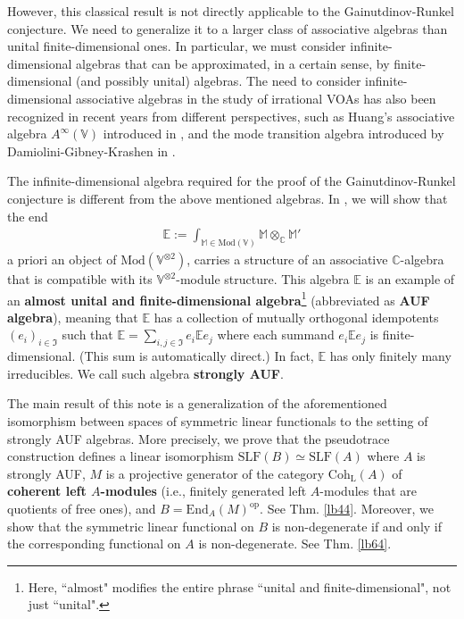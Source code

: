 \documentclass[11pt,b5paper,notitlepage]{article}
\theoremstyle{definition}
\theoremstyle{plain}
\newcommand{\fk}{\mathfrak}
\newcommand{\End}{\mathrm{End}} %
\newcommand{\opp}{\mathrm{op}}
\newcommand{\Vbb}{\mathbb V}
\newcommand{\Mbb}{\mathbb M}
\newcommand{\Cbb}{\mathbb C}
\newcommand{\Ebb}{\mathbb E}
\newcommand{\Mod}{\mathrm{Mod}}
\newcommand{\dps}{\displaystyle}
\newcommand{\Coh}{\mathrm{Coh}_{\mathrm L}}
\newcommand{\SLF}{\mathrm{SLF}}
\numberwithin{equation}{section}
\begin{document}
However, this classical result is not directly applicable to the Gainutdinov-Runkel conjecture. We need to generalize it to a larger class of associative algebras than unital finite-dimensional ones. In particular, we must consider infinite-dimensional algebras that can be approximated, in a certain sense, by finite-dimensional (and possibly unital) algebras. The need to consider infinite-dimensional associative algebras in the study of irrational VOAs has also been recognized in recent years from different perspectives, such as Huang's associative algebra $A^\infty(\Vbb)$ introduced in \cite{Hua-associative}, and the mode transition algebra introduced by Damiolini-Gibney-Krashen in \cite{DGK2}.


The infinite-dimensional algebra required for the proof of the Gainutdinov-Runkel conjecture is different from the above mentioned algebras. In \cite{GZ5}, we will show that the end
\begin{align*}
\dps\Ebb:=\int_{\Mbb\in\Mod(\Vbb)}\Mbb\otimes_\Cbb\Mbb'
\end{align*}
a priori an object of $\Mod(\Vbb^{\otimes2})$, carries a structure of an associative $\Cbb$-algebra that is compatible with its $\Vbb^{\otimes2}$-module structure. This algebra $\Ebb$ is an example of an \textbf{almost unital and finite-dimensional algebra}\footnote{Here, ``almost" modifies the entire phrase ``unital and finite-dimensional", not just ``unital".} (abbreviated as \textbf{AUF algebra}), meaning that $\Ebb$ has a collection of mutually orthogonal idempotents $(e_i)_{i\in\fk I}$ such that $\Ebb=\sum_{i,j\in\fk I}e_i\Ebb e_j$ where each summand $e_i\Ebb e_j$ is finite-dimensional. (This sum is automatically direct.) In fact, $\Ebb$ has only finitely many irreducibles. We call such algebra \textbf{strongly AUF}.

The main result of this note is a generalization of the aforementioned isomorphism between spaces of symmetric linear functionals to the setting of strongly AUF algebras. More precisely, we prove that the pseudotrace construction defines a linear isomorphism $\SLF(B)\simeq\SLF(A)$ where $A$ is strongly AUF, $M$ is a projective generator of the category $\Coh(A)$ of \textbf{coherent left $A$-modules} (i.e., finitely generated left $A$-modules that are quotients of free ones), and $B=\End_A(M)^\opp$. See Thm. \ref{lb44}. Moreover, we show that the symmetric linear functional on $B$ is non-degenerate if and only if the corresponding functional on $A$ is non-degenerate. See Thm. \ref{lb64}.
\end{document}
